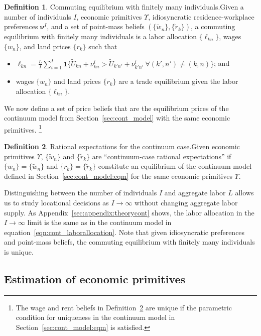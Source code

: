 \documentclass[11pt]{article}
\theoremstyle{definition}
\newtheorem{definition}{Definition}[section]
\begin{document}
\begin{definition}{Commuting equilibrium with finitely many individuals.}\label{def:finitecommutingequilibrium}
Given a number of individuals $I$,  economic primitives $\Upsilon$, idiosyncratic residence-workplace preferences $\boldsymbol \nu^{I}$,
and a set of point-mass beliefs $(\{\tilde{w}_n\},\{\tilde{r}_k\})$,
a commuting equilibrium with finitely many individuals is a
labor allocation $\{\ell_{kn}\}$, wages $\{w_n\}$, and land prices $\{r_k\}$
such that
\begin{itemize}
	\item $\ell_{kn} = \frac{L}{I} \sum_{i=1}^{I} \mathbf{1}\{\tilde{U}_{kn} + \nu_{kn}^{i}  > \tilde{U}_{k'n'} + \nu_{k'n'}^{i} \ \forall (k',n') \neq (k,n)\}$; and
	\item wages $\{w_n\}$ and land prices $\{r_k\}$ are a trade equilibrium given the labor allocation $\{\ell_{kn}\}$.
\end{itemize}
\end{definition}

We now define a set of price beliefs that are the equilibrium prices of the continuum model from Section~\ref{sec:cont_model} with the same economic primitives.%
\footnote{
	The wage and rent beliefs in Definition~\ref{def:continuumcaserationalexpectatons} are unique
	if the parametric condition for uniqueness in the continuum model in Section~\ref{sec:cont_model:eqm} is satisfied.
}
\begin{definition}{Rational expectations for the continuum case.}\label{def:continuumcaserationalexpectatons}
Given economic primitives $\Upsilon$,
$\{\tilde{w}_n\}$ and $\{\tilde{r}_k\}$ are ``continuum-case rational expectations'' if $\{w_n\} = \{\tilde{w}_n\}$ and $\{r_k\}= \{\tilde{r}_k\}$ constitute an equilibrium of the continuum model defined in Section~\ref{sec:cont_model:eqm} for the same economic primitives $\Upsilon$.
\end{definition}

Distinguishing between the number of individuals $I$ and aggregate labor $L$ allows us to
study locational decisions as $I \to \infty$ without changing aggregate labor supply.
As Appendix~\ref{sec:appendix:theorycont} shows,
the labor allocation in the $I \to \infty$ limit
is the same as in the continuum model in equation~\eqref{eqn:cont_laborallocation}.
Note that given idiosyncratic preferences and point-mass beliefs,
the commuting equilibrium with finitely many individuals is unique.

\subsection{Estimation of economic primitives}\label{sec:finitemodel:estimation}
\end{document}
